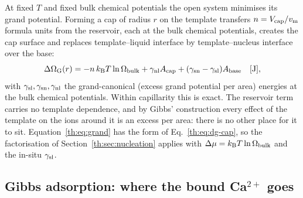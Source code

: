 At fixed $T$ and fixed bulk chemical potentials the open system minimises its grand potential.
Forming a cap of radius $r$ on the template transfers $n=V_\mathrm{cap}/v_\mathrm{m}$ formula units from the
reservoir, each at the bulk chemical potentials, creates the cap surface and replaces template--liquid
interface by template--nucleus interface over the base:
\begin{equation}\label{th:eq:grand}
\Delta\Omega_\mathrm{G}(r)=-n\,k_\mathrm{B} T\ln\Omega_\mathrm{bulk}+\gamma_\mathrm{nl} A_\mathrm{cap}+(\gamma_\mathrm{sn}-\gamma_\mathrm{sl})A_\mathrm{base} \quad[\mathrm{J}],
\end{equation}
with $\gamma_\mathrm{sl},\gamma_\mathrm{sn},\gamma_\mathrm{nl}$ the grand-canonical (excess grand potential per area) energies at the bulk
chemical potentials. Within capillarity this is exact. The reservoir term carries no template
dependence, and by Gibbs' construction every effect of the template on the ions around it is an
excess per area: there is no other place for it to sit. Equation~\eqref{th:eq:grand} has the form
of Eq.~\eqref{th:eq:dg-cap}, so the factorisation of Section~\ref{th:sec:nucleation} applies with
$\Delta\mu=k_\mathrm{B} T\ln\Omega_\mathrm{bulk}$ and the in-situ $\gamma_\mathrm{sl}$.

\subsection{Gibbs adsorption: where the bound Ca$^{2+}$ goes}

